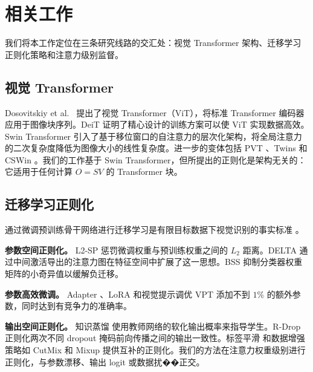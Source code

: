 \documentclass[preprint,12pt]{elsarticle}
\begin{document}
\section{相关工作}

我们将本工作定位在三条研究线路的交汇处：视觉 Transformer 架构、迁移学习正则化策略和注意力级别监督。

\subsection{视觉 Transformer}

Dosovitskiy et al.~\cite{dosovitskiy2021image} 提出了视觉 Transformer（ViT），将标准 Transformer 编码器 \cite{vaswani2017attention} 应用于图像块序列。DeiT \cite{touvron2021training} 证明了精心设计的训练方案可以使 ViT 实现数据高效。Swin Transformer \cite{liu2021swin} 引入了基于移位窗口的自注意力的层次化架构，将全局注意力的二次复杂度降低为图像大小的线性复杂度。进一步的变体包括 PVT \cite{wang2021pyramid}、Twins \cite{chu2021twins} 和 CSWin \cite{dong2022cswin}。我们的工作基于 Swin Transformer，但所提出的正则化是架构无关的：它适用于任何计算 $O = SV$ 的 Transformer 块。

\subsection{迁移学习正则化}

通过微调预训练骨干网络进行迁移学习是有限目标数据下视觉识别的事实标准 \cite{zhuang2020comprehensive}。

\textbf{参数空间正则化。} L2-SP \cite{li2018explicit} 惩罚微调权重与预训练权重之间的 $L_2$ 距离。DELTA \cite{li2019delta} 通过中间激活导出的注意力图在特征空间中扩展了这一思想。BSS \cite{chen2019catastrophic} 抑制分类器权重矩阵的小奇异值以缓解负迁移。

\textbf{参数高效微调。} Adapter \cite{houlsby2019parameter}、LoRA \cite{hu2022lora} 和视觉提示调优 VPT \cite{jia2022visual} 添加不到 $1\%$ 的额外参数，同时达到有竞争力的准确率。

\textbf{输出空间正则化。} 知识蒸馏 \cite{hinton2015distilling} 使用教师网络的软化输出概率来指导学生。R-Drop \cite{liang2021rdrop} 正则化两次不同 dropout 掩码前向传播之间的输出一致性。标签平滑 \cite{szegedy2016rethinking} 和数据增强策略如 CutMix \cite{yun2019cutmix} 和 Mixup \cite{zhang2018mixup} 提供互补的正则化。我们的方法在注意力权重级别进行正则化，与参数漂移、输出 logit 或数据扰��正交。
\end{document}
